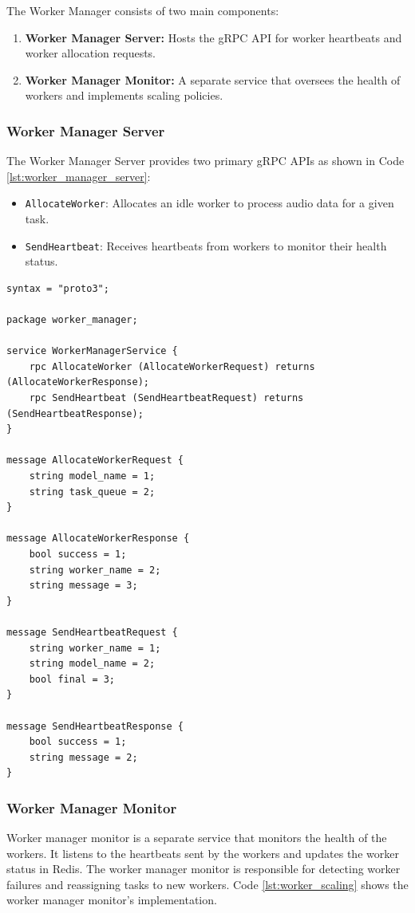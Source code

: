 The Worker Manager consists of two main components:
\begin{enumerate}
    \item \textbf{Worker Manager Server:} Hosts the gRPC API for worker heartbeats and worker allocation requests.
    \item \textbf{Worker Manager Monitor:} A separate service that oversees the health of workers and implements scaling policies.
\end{enumerate}

\subsubsection{Worker Manager Server}
The Worker Manager Server provides two primary gRPC APIs as shown in  Code \ref{lst:worker_manager_server}:
\begin{itemize}
    \item \texttt{AllocateWorker}: Allocates an idle worker to process audio data for a given task.
    \item \texttt{SendHeartbeat}: Receives heartbeats from workers to monitor their health status.
\end{itemize}

\begin{lstlisting}[language=Proto3, caption={Worker Manager Server gRPC Proto File}, label={lst:worker_manager_server}]
syntax = "proto3";

package worker_manager;

service WorkerManagerService {
    rpc AllocateWorker (AllocateWorkerRequest) returns (AllocateWorkerResponse);
    rpc SendHeartbeat (SendHeartbeatRequest) returns (SendHeartbeatResponse);
}

message AllocateWorkerRequest {
    string model_name = 1;
    string task_queue = 2;
}

message AllocateWorkerResponse {
    bool success = 1;
    string worker_name = 2;
    string message = 3;
}

message SendHeartbeatRequest {
    string worker_name = 1;
    string model_name = 2;
    bool final = 3;
}

message SendHeartbeatResponse {
    bool success = 1;
    string message = 2;
}
\end{lstlisting}    

\subsubsection{Worker Manager Monitor}
Worker manager monitor is a separate service that monitors the health of the workers. It listens to the heartbeats sent by the workers and updates the worker status in Redis. The worker manager monitor is responsible for detecting worker failures and reassigning tasks to new workers. Code \ref{lst:worker_scaling} shows the worker manager monitor's implementation.

